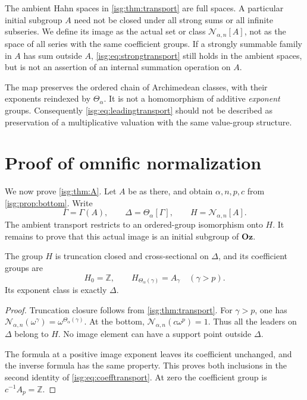 \documentclass[11pt]{article}
\theoremstyle{definition}
\theoremstyle{remark}
\newcommand{\Oz}{\ensuremath{\mathbf{Oz}}}
\newcommand{\Z}{\mathbb{Z}}
\newcommand{\Rect}{\mathcal{N}_{\alpha,n}}
\newcommand{\tht}{\Theta_{\alpha}}
\begin{document}
\begin{remark}\label{isg:rem:nocompletion}
The ambient Hahn spaces in \cref{isg:thm:transport} are full spaces. A
particular initial subgroup $A$ need not be closed under all strong sums
or all infinite subseries. We define its image as the actual set or class
$\Rect[A]$, not as the space of all series with the same coefficient
groups. If a strongly summable family in $A$ has sum outside $A$,
\eqref{isg:eq:strongtransport} still holds in the ambient spaces, but is not
an assertion of an internal summation operation on $A$.
\end{remark}

\begin{remark}\label{isg:rem:preserved}
The map preserves the ordered chain of Archimedean classes, with their
exponents reindexed by $\tht$. It is not a homomorphism of additive
\emph{exponent} groups. Consequently \eqref{isg:eq:leadingtransport} should
not be described as preservation of a multiplicative valuation with the
same value-group structure.
\end{remark}

\section{Proof of omnific normalization}\label{isg:sec:normalization}

We now prove \cref{isg:thm:A}. Let $A$ be as there, and obtain
$\alpha,n,p,c$ from \cref{isg:prop:bottom}. Write
\[
 \Gamma=\Gamma(A),\qquad \Delta=\tht[\Gamma],
 \qquad H=\Rect[A].
\]
The ambient transport restricts to an ordered-group isomorphism onto
$H$. It remains to prove that this actual image is an initial subgroup
of $\Oz$.

\begin{lemma}\label{isg:lem:coefficients}
The group $H$ is truncation closed and cross-sectional on $\Delta$,
and its coefficient groups are
\begin{equation}\label{isg:eq:coefftransport}
 H_0=\Z,\qquad H_{\tht(\gamma)}=A_\gamma\quad(\gamma>p).
\end{equation}
Its exponent class is exactly $\Delta$.
\end{lemma}
\begin{proof}
Truncation closure follows from \cref{isg:thm:transport}. For
$\gamma>p$, one has
$\Rect(\omega^\gamma)=\omega^{\tht(\gamma)}$. At the bottom,
$\Rect(c\omega^p)=1$. Thus all the leaders on $\Delta$ belong to $H$.
No image element can have a support point outside $\Delta$.

The formula at a positive image exponent leaves its coefficient
unchanged, and the inverse formula has the same property. This proves
both inclusions in the second identity of \eqref{isg:eq:coefftransport}.
At zero the coefficient group is $c^{-1}A_p=\Z$.
\end{proof}
\end{document}
